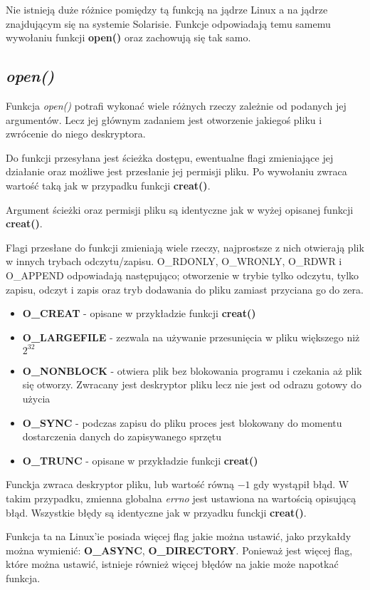 \documentclass{article}
\begin{document}
Nie istnieją duże różnice pomiędzy tą funkcją na jądrze Linux a na jądrze znajdującym się na systemie Solarisie.
Funkcje odpowiadają temu samemu wywołaniu funkcji \textbf{open()} oraz zachowują się tak samo.

\subsection{\textit{open()}}
Funkcja \textit{open()} potrafi wykonać wiele różnych rzeczy zależnie od podanych jej argumentów.
Lecz jej głównym zadaniem jest otworzenie jakiegoś pliku i zwrócenie do niego deskryptora.

Do funkcji przesyłana jest ścieżka dostępu, ewentualne flagi zmieniające jej działanie oraz możliwe jest przesłanie jej permisji pliku.
Po wywołaniu zwraca wartość taką jak w przypadku funkcji \textbf{creat()}.

Argument ścieżki oraz permisji pliku są identyczne jak w wyżej opisanej funkcji \textbf{creat()}.

Flagi przesłane do funkcji zmieniają wiele rzeczy, najprostsze z nich otwierają plik w innych trybach odczytu/zapisu.
O\_RDONLY, O\_WRONLY, O\_RDWR i O\_APPEND odpowiadają następująco; otworzenie w trybie tylko odczytu, tylko zapisu, odczyt i zapis oraz tryb dodawania do pliku zamiast przyciana go do zera.

\begin{itemize}
\item \textbf{O\_CREAT} - opisane w przykładzie funkcji \textbf{creat()}
\item \textbf{O\_LARGEFILE} - zezwala na używanie przesunięcia w pliku większego niż $2^{32}$
\item \textbf{O\_NONBLOCK} - otwiera plik bez blokowania programu i czekania aż plik się otworzy. Zwracany jest deskryptor pliku lecz nie jest od odrazu gotowy do użycia
\item \textbf{O\_SYNC} - podczas zapisu do pliku proces jest blokowany do momentu dostarczenia danych do zapisywanego sprzętu
\item \textbf{O\_TRUNC} - opisane w przykładzie funkcji \textbf{creat()}
\end{itemize}

Funckja zwraca deskryptor pliku, lub wartość równą $-1$ gdy wystąpił błąd.
W takim przypadku, zmienna globalna \textit{errno} jest ustawiona na wartością opisującą błąd.
Wszystkie błędy są identyczne jak w przyadku funckji \textbf{creat()}.

Funkcja ta na Linux'ie posiada więcej flag jakie można ustawić, jako przykałdy można wymienić: \textbf{O\_ASYNC}, \textbf{O\_DIRECTORY}.
Ponieważ jest więcej flag, które można ustawić, istnieje również więcej błędów na jakie może napotkać funkcja. 
\end{document}
